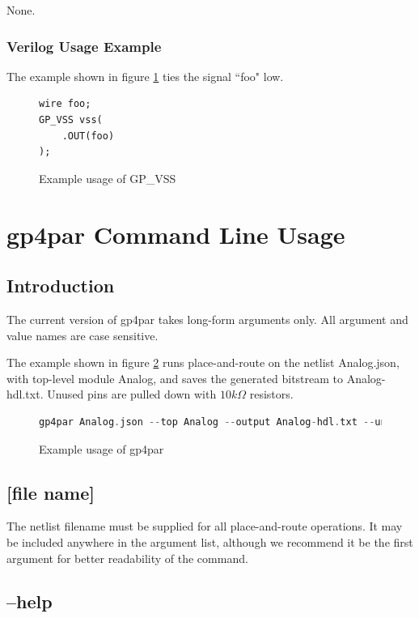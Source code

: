 \documentclass{article}
\begin{document}
None.

\subsubsection{Verilog Usage Example}

The example shown in figure \ref{gp-vss-example} ties the signal ``foo" low.

\begin{figure}[h]
\begin{lstlisting}
wire foo;
GP_VSS vss(
	.OUT(foo)
);
\end{lstlisting}
\caption{Example usage of GP\_VSS}
\label{gp-vss-example}
\end{figure}

\pagebreak
\section{gp4par Command Line Usage}

\subsection{Introduction}

The current version of gp4par takes long-form arguments only. All argument and value names are case sensitive.

The example shown in figure \ref{gp-cmd-example} runs place-and-route on the netlist Analog.json, with top-level module 
Analog, and saves the generated bitstream to Analog-hdl.txt. Unused pins are pulled down with $10 k\Omega$ resistors.

\begin{figure}[h]
\begin{lstlisting}[language=c]
gp4par Analog.json --top Analog --output Analog-hdl.txt --unused-pull down --unused-drive 10k
\end{lstlisting}
\caption{Example usage of gp4par}
\label{gp-cmd-example}
\end{figure}

\subsection{[file name]}

The netlist filename must be supplied for all place-and-route operations. It may be included anywhere in the argument 
list, although we recommend it be the first argument for better readability of the command.

\subsection{--help}
\end{document}

